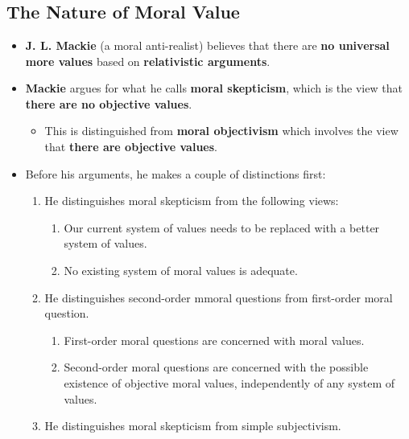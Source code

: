 \documentclass[16pt]{article}
\begin{document}
    \section*{}

    \subsection*{The Nature of Moral Value}
    \begin{itemize}
        \item \textbf{J. L. Mackie} (a moral anti-realist) believes that there are \textbf{no universal more values} based on \textbf{relativistic arguments}.
        \item \textbf{Mackie} argues for what he calls \textbf{moral skepticism}, which is the view that \textbf{there are no objective values}.
        \begin{itemize}
            \item This is distinguished from \textbf{moral objectivism} which involves  the view that \textbf{there are objective values}.
        \end{itemize}
        \item Before his arguments, he makes a couple of distinctions first:
        \begin{enumerate}
            \item He distinguishes moral skepticism from the following views:
            \begin{enumerate}
                \item Our current system of values needs to be replaced with a better system of values.
                \item No existing system of moral values is adequate.
            \end{enumerate}
            \item He distinguishes second-order mmoral questions from first-order moral question.
            \begin{enumerate}
                \item First-order moral questions are concerned with moral values.
                \item Second-order moral questions are concerned with the possible existence of objective moral values, independently of any system of values.
            \end{enumerate}
            \item He distinguishes moral skepticism from simple subjectivism.

\end{enumerate}
\end{itemize}
\end{document}
